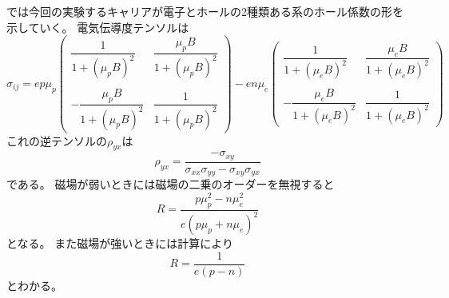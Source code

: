 \documentclass[11pt,dvipdfmx,a4paper]{jsarticle}
\numberwithin{equation}{section}
\begin{document}
では今回の実験するキャリアが電子とホールの2種類ある系のホール係数の形を示していく。
電気伝導度テンソルは
\begin{equation}
	\sigma_{ij} =
	ep\mu_p
	\begin{pmatrix}
		\dfrac{1}{1+(\mu_p B)^2} & \dfrac{\mu_p B}{1+(\mu_p B)^2}\\
		&\\
		-\dfrac{\mu_p B}{1+(\mu_p B)^2} & \dfrac{1}{1+(\mu_p B)^2}
	\end{pmatrix}
	-
	en\mu_e
	\begin{pmatrix}
		\dfrac{1}{1+(\mu_e B)^2} & \dfrac{\mu_e B}{1+(\mu_e B)^2}\\
		&\\
		-\dfrac{\mu_e B}{1+(\mu_e B)^2} & \dfrac{1}{1+(\mu_e B)^2}
	\end{pmatrix}
\end{equation}
これの逆テンソルの\(\rho_{yx}\)は
\begin{equation}
	\rho_{yx} = \frac{-\sigma_{xy}}{\sigma_{xx}\sigma_{yy}-\sigma_{xy}\sigma_{yx}}
\end{equation}
である。
磁場が弱いときには磁場の二乗のオーダーを無視すると
\begin{equation}
	R = \frac{p\mu_p^2 - n\mu_e^2}{e(p\mu_p+n\mu_e)^2} \label{eq:2-23}
\end{equation}
となる。
また磁場が強いときには計算により
\begin{equation}
	R = \frac{1}{e(p-n)}
\end{equation}
とわかる。 %

\clearpage
\end{document}
